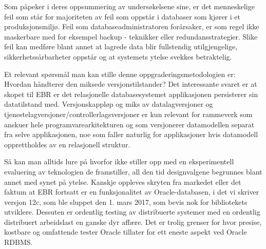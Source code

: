 Som \cite{oliveira2006understanding} påpeker i deres oppsummering av undersøkelsene sine, er det menneskelige feil som står for majoriteten av feil som oppstår i databaser som kjører i et produksjonsmiljø. Feil som databaseadministratoren forårsaker, er som regel ikke maskerbare med for eksempel backup - teknikker eller redundansstrategier. Slike feil kan medføre blant annet at lagrede data blir fullstendig utilgjengelige, sikkerhetssårbarheter oppstår og at systemets ytelse svekkes betraktelig.

Et relevant spørsmål man kan stille denne oppgraderingsmetodologien er: Hvordan håndterer den miksede versjonstilstander? Det interessante svaret er at skopet til EBR er det relasjonelle databasesystemet applikasjonen persisterer sin datatilstand med. Versjonskappløp og miks av datalagversjoner og tjenestelagversjoner/controllerlagsversjoner er kun relevant for rammeverk som anskuer hele programvarearkitekturen og som versjonerer datamodellen separat fra selve applikasjonen, noe som faller naturlig for applikasjoner hvis datamodell opprettholdes av en relasjonell struktur.

Så kan man alltids lure på hvorfor \cite{choi2009} ikke stiller opp med en eksperimentell evaluering av teknologien de framstiller, all den tid designvalgene begrunnes blant annet med synet på ytelse. Kanskje oppleves skryten fra markedet eller det faktum at EBR fortsatt er en funksjonalitet av Oracle-databasen, i det vi skriver versjon 12c, som ble sluppet den 1. mars 2017, som bevis nok for bibliotekets utviklere. Dessuten er ordentlig testing av distribuerte systemer med en ordentlig distribuert arbeidslast en ganske dyr affære. Det er trolig grenser for hvor presise, kostbare og omfattende tester Oracle tillater for ett eneste aspekt ved Oracle RDBMS.
